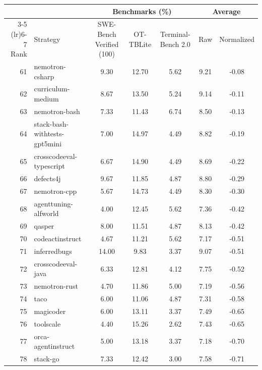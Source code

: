 \documentclass{llmxive}
\begin{document}
\begin{table}[!htbp]
\centering
\footnotesize
\setlength{\tabcolsep}{4pt}
\begin{tabular}{rlccccc}
\toprule
 & & \multicolumn{3}{c}{Benchmarks (\%)} & \multicolumn{2}{c}{Average} \\
\cmidrule(lr){3-5} \cmidrule(lr){6-7}
Rank & Strategy & SWE-Bench Verified (100) & OT-TBLite & Terminal-Bench 2.0 & Raw & Normalized \\
\midrule
61 & nemotron-csharp                &  9.30 & 12.70 &  5.62 &  9.21 & -0.08 \\
62 & curriculum-medium              &  8.67 & 13.50 &  5.24 &  9.14 & -0.11 \\
63 & nemotron-bash                  &  7.33 & 11.43 &  6.74 &  8.50 & -0.13 \\
64 & stack-bash-withtests-gpt5mini  &  7.00 & 14.97 &  4.49 &  8.82 & -0.19 \\
65 & crosscodeeval-typescript       &  6.67 & 14.90 &  4.49 &  8.69 & -0.22 \\
66 & defects4j                      &  9.67 & 11.85 &  4.87 &  8.80 & -0.29 \\
67 & nemotron-cpp                   &  5.67 & 14.73 &  4.49 &  8.30 & -0.30 \\
68 & agenttuning-alfworld           &  4.00 & 12.45 &  5.62 &  7.36 & -0.42 \\
69 & qasper                         &  8.00 & 11.51 &  4.87 &  8.13 & -0.42 \\
70 & codeactinstruct                &  4.67 & 11.21 &  5.62 &  7.17 & -0.51 \\
71 & inferredbugs                   & 14.00 &  9.83 &  3.37 &  9.07 & -0.51 \\
72 & crosscodeeval-java             &  6.33 & 12.81 &  4.12 &  7.75 & -0.52 \\
73 & nemotron-rust                  &  4.70 & 11.86 &  5.00 &  7.19 & -0.56 \\
74 & taco                           &  6.00 & 11.06 &  4.87 &  7.31 & -0.58 \\
75 & magicoder                      &  6.00 & 13.11 &  3.37 &  7.49 & -0.65 \\
76 & toolscale                      &  4.40 & 15.26 &  2.62 &  7.43 & -0.65 \\
77 & orca-agentinstruct             &  5.00 & 13.18 &  3.37 &  7.18 & -0.70 \\
78 & stack-go                       &  7.33 & 12.42 &  3.00 &  7.58 & -0.71 \\

\end{tabular}
\end{table}
\end{document}
